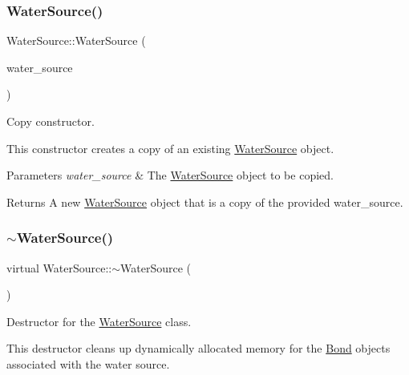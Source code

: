 \subsubsection{\texorpdfstring{Water\+Source()}{WaterSource()}\hspace{0.1cm}{\footnotesize\ttfamily [8/8]}}
{\footnotesize\ttfamily Water\+Source\+::\+Water\+Source (\begin{DoxyParamCaption}\item[{const \mbox{\hyperlink{classWaterSource}{Water\+Source}} \&}]{water\+\_\+source }\end{DoxyParamCaption})}



Copy constructor. 

This constructor creates a copy of an existing {\ttfamily \mbox{\hyperlink{classWaterSource}{Water\+Source}}} object.


\begin{DoxyParams}{Parameters}
{\em water\+\_\+source} & The {\ttfamily \mbox{\hyperlink{classWaterSource}{Water\+Source}}} object to be copied.\\
\hline
\end{DoxyParams}
\begin{DoxyReturn}{Returns}
A new {\ttfamily \mbox{\hyperlink{classWaterSource}{Water\+Source}}} object that is a copy of the provided {\ttfamily water\+\_\+source}. 
\end{DoxyReturn}
\mbox{\label{classWaterSource_aa3b9261264152782c3115d2f563f1caf}} 
\subsubsection{\texorpdfstring{$\sim$\+Water\+Source()}{~WaterSource()}}
{\footnotesize\ttfamily virtual Water\+Source\+::$\sim$\+Water\+Source (\begin{DoxyParamCaption}{ }\end{DoxyParamCaption})\hspace{0.3cm}{\ttfamily [virtual]}}



Destructor for the {\ttfamily \mbox{\hyperlink{classWaterSource}{Water\+Source}}} class. 

This destructor cleans up dynamically allocated memory for the {\ttfamily \mbox{\hyperlink{classBond}{Bond}}} objects associated with the water source.


